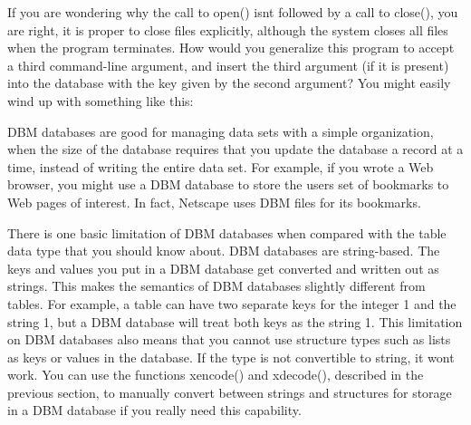 
If you are wondering why the call to \textsf{open()}
isn{\textquotesingle}t followed by a call to \textsf{close()}, you are
right, it is proper to close files explicitly, although the system
closes all files when the program terminates. How would you generalize
this program to accept a third command-line argument, and insert the
third argument (if it is present) into the database with the key given
by the second argument? You might easily wind up with something like
this:


DBM databases are good for managing data sets with a simple
organization, when the size of the database requires that you update
the database a record at a time, instead of writing the entire data
set. For example, if you wrote a Web browser, you might use a DBM
database to store the user{\textquotesingle}s set of bookmarks to Web
pages of interest. In fact, Netscape uses DBM files for its bookmarks.

There is one basic limitation of DBM databases when compared with the
table data type that you should know about. DBM databases are
string-based. The keys and values you put in a DBM database get
converted and written out as strings. This makes the semantics of DBM
databases slightly different from tables. For example, a table can have
two separate keys for the integer \textsf{1} and the string
\textsf{{\textquotedbl}1{\textquotedbl}}, but a DBM database will treat
both keys as the string \textsf{{\textquotedbl}1{\textquotedbl}}. This
limitation on DBM databases also means that you cannot use structure
types such as lists as keys or values in the database. If the type is
not convertible to string, it won{\textquotesingle}t work. You can use
the functions \textsf{xencode()} and \textsf{xdecode()}, described in
the previous section, to manually convert between strings and
structures for storage in a DBM database if you really need this
capability.

